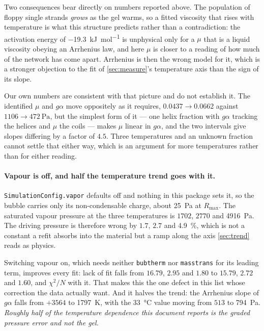 \documentclass[10pt]{article}
\begin{document}
Two consequences bear directly on numbers reported above. The population of floppy single
strands \emph{grows} as the gel warms, so a fitted viscosity that rises with temperature is what
this structure predicts rather than a contradiction: the activation energy of
\SI{-19.3}{\kilo\joule\per\mole} is unphysical only for a $\mu$ that is a liquid viscosity
obeying an Arrhenius law, and here $\mu$ is closer to a reading of how much of the network has
come apart. Arrhenius is then the wrong model for it, which is a stronger objection to the fit of
\cref{sec:measure}'s temperature axis than the sign of its slope.

Our own numbers are consistent with that picture and do not establish it. The identified $\mu$
and $g\alpha$ move oppositely as it requires, $0.0437 \to 0.0662$ against $1106 \to
\SI{472}{\pascal}$, but the simplest form of it --- one helix fraction with $g\alpha$ tracking the
helices and $\mu$ the coils --- makes $\mu$ linear in $g\alpha$, and the two intervals give slopes
differing by a factor of $4.5$. Three temperatures and an unknown fraction cannot settle that
either way, which is an argument for more temperatures rather than for either reading.

\paragraph{Vapour is off, and half the temperature trend goes with it.}
\texttt{SimulationConfig.vapor} defaults off and nothing in this package sets it, so the bubble
carries only its non-condensable charge, about \SI{25}{\pascal} at $R_{\max}$. The saturated
vapour pressure at the three temperatures is $1702$, $2770$ and \SI{4916}{\pascal}. The driving
pressure is therefore wrong by $1.7$, $2.7$ and \SI{4.9}{\percent}, which is not a constant a
refit absorbs into the material but a ramp along the axis \cref{sec:trend} reads as physics.

Switching vapour on, which needs neither \texttt{bubtherm} nor \texttt{masstrans} for its leading
term, improves every fit: lack of fit falls from $16.79$, $2.95$ and $1.80$ to $15.79$, $2.72$
and $1.60$, and $\chi^2/N$ with it. That makes this the one defect in this list whose correction
the data actually want. And it halves the trend: the Arrhenius slope of $g\alpha$ falls from
$+3564$ to \SI{+1797}{\kelvin}, with the \SI{33}{\celsius} value moving from $513$ to
\SI{794}{\pascal}. \emph{Roughly half of the temperature dependence this document reports is the
graded pressure error and not the gel.}
\end{document}
